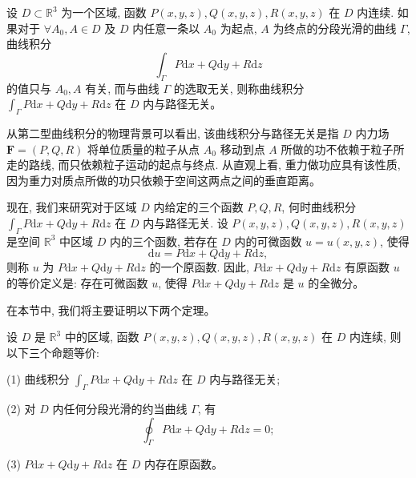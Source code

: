 \documentclass[UTF8,12pt,a4paper,fontset=fandol]{ctexart}
\begin{document}
\begin{definition}\label{course-definition-16-7-1}\quad 设 $D\subset\mathbb R^3$ 为一个区域, 函数 $P(x,y,z),Q(x,y,z),R(x,y,z)$ 在 $D$ 内连续. 如果对于 $\forall A_0,A\in D$ 及 $D$ 内任意一条以 $A_0$ 为起点, $A$ 为终点的分段光滑的曲线 $\Gamma$, 曲线积分
\[
  \int_\Gamma P\mathrm dx+Q\mathrm dy+R\mathrm dz
\]
的值只与 $A_0,A$ 有关, 而与曲线 $\Gamma$ 的选取无关, 则称曲线积分 $\int_\Gamma P\mathrm dx+Q\mathrm dy+R\mathrm dz$ 在 $D$ 内与路径无关。

从第二型曲线积分的物理背景可以看出, 该曲线积分与路径无关是指 $D$ 内力场 $\boldsymbol F=(P,Q,R)$ 将单位质量的粒子从点 $A_0$ 移动到点 $A$ 所做的功不依赖于粒子所走的路线, 而只依赖粒子运动的起点与终点. 从直观上看, 重力做功应具有该性质, 因为重力对质点所做的功只依赖于空间这两点之间的垂直距离。

现在, 我们来研究对于区域 $D$ 内给定的三个函数 $P,Q,R$, 何时曲线积分 $\int_\Gamma P\mathrm dx+Q\mathrm dy+R\mathrm dz$ 在 $D$ 内与路径无关. 设 $P(x,y,z),Q(x,y,z),R(x,y,z)$ 是空间 $\mathbb R^3$ 中区域 $D$ 内的三个函数, 若存在 $D$ 内的可微函数 $u=u(x,y,z)$, 使得
\[
  \mathrm du=P\mathrm dx+Q\mathrm dy+R\mathrm dz,
\]
则称 $u$ 为 $P\mathrm dx+Q\mathrm dy+R\mathrm dz$ 的一个原函数. 因此, $P\mathrm dx+Q\mathrm dy+R\mathrm dz$ 有原函数 $u$ 的等价定义是: 存在可微函数 $u$, 使得 $P\mathrm dx+Q\mathrm dy+R\mathrm dz$ 是 $u$ 的全微分。

在本节中, 我们将主要证明以下两个定理。

\end{definition}
\begin{theorem}\label{course-theorem-16-7-1}\quad 设 $D$ 是 $\mathbb R^3$ 中的区域, 函数 $P(x,y,z),Q(x,y,z),R(x,y,z)$ 在 $D$ 内连续, 则以下三个命题等价:

(1) 曲线积分 $\int_\Gamma P\mathrm dx+Q\mathrm dy+R\mathrm dz$ 在 $D$ 内与路径无关;

(2) 对 $D$ 内任何分段光滑的约当曲线 $\Gamma$, 有
\[
  \oint_\Gamma P\mathrm dx+Q\mathrm dy+R\mathrm dz=0;
\]

(3) $P\mathrm dx+Q\mathrm dy+R\mathrm dz$ 在 $D$ 内存在原函数。

\end{theorem}
\end{document}
